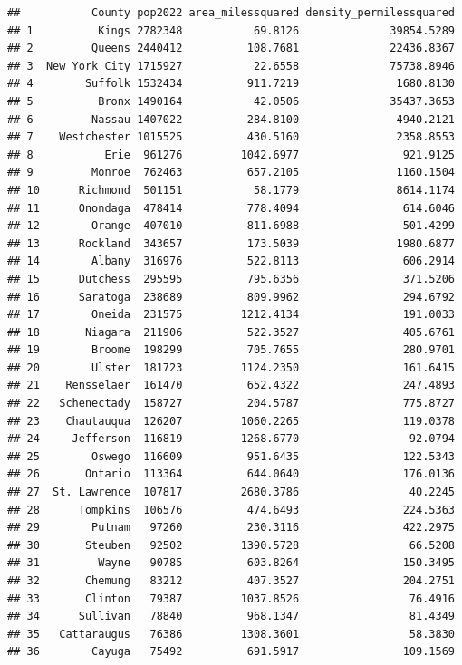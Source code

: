 \documentclass[
  12pt,
]{article}
\begin{document}
\begin{verbatim}
##           County pop2022 area_milessquared density_permilessquared
## 1          Kings 2782348           69.8126              39854.5289
## 2         Queens 2440412          108.7681              22436.8367
## 3  New York City 1715927           22.6558              75738.8946
## 4        Suffolk 1532434          911.7219               1680.8130
## 5          Bronx 1490164           42.0506              35437.3653
## 6         Nassau 1407022          284.8100               4940.2121
## 7    Westchester 1015525          430.5160               2358.8553
## 8           Erie  961276         1042.6977                921.9125
## 9         Monroe  762463          657.2105               1160.1504
## 10      Richmond  501151           58.1779               8614.1174
## 11      Onondaga  478414          778.4094                614.6046
## 12        Orange  407010          811.6988                501.4299
## 13      Rockland  343657          173.5039               1980.6877
## 14        Albany  316976          522.8113                606.2914
## 15      Dutchess  295595          795.6356                371.5206
## 16      Saratoga  238689          809.9962                294.6792
## 17        Oneida  231575         1212.4134                191.0033
## 18       Niagara  211906          522.3527                405.6761
## 19        Broome  198299          705.7655                280.9701
## 20        Ulster  181723         1124.2350                161.6415
## 21    Rensselaer  161470          652.4322                247.4893
## 22   Schenectady  158727          204.5787                775.8727
## 23    Chautauqua  126207         1060.2265                119.0378
## 24     Jefferson  116819         1268.6770                 92.0794
## 25        Oswego  116609          951.6435                122.5343
## 26       Ontario  113364          644.0640                176.0136
## 27  St. Lawrence  107817         2680.3786                 40.2245
## 28      Tompkins  106576          474.6493                224.5363
## 29        Putnam   97260          230.3116                422.2975
## 30       Steuben   92502         1390.5728                 66.5208
## 31         Wayne   90785          603.8264                150.3495
## 32       Chemung   83212          407.3527                204.2751
## 33       Clinton   79387         1037.8526                 76.4916
## 34      Sullivan   78840          968.1347                 81.4349
## 35   Cattaraugus   76386         1308.3601                 58.3830
## 36        Cayuga   75492          691.5917                109.1569

\end{verbatim}
\end{document}
